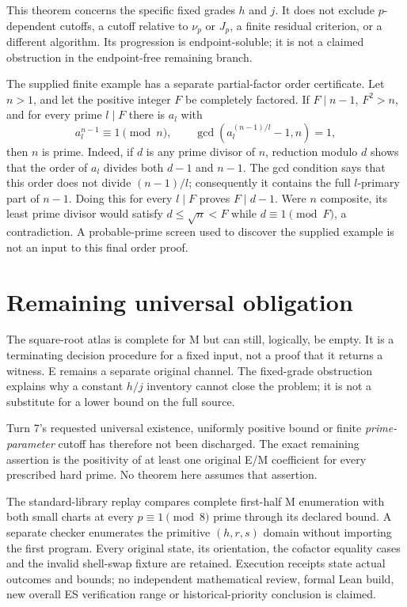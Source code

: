 This theorem concerns the specific fixed grades $h$ and $j$. It does not exclude
$p$-dependent cutoffs, a cutoff relative to $\nu_p$ or $J_p$, a finite residual
criterion, or a different algorithm. Its progression is endpoint-soluble; it is
not a claimed obstruction in the endpoint-free remaining branch.

The supplied finite example has a separate partial-factor order certificate.
Let $n>1$, and let the positive integer $F$ be completely factored. If
$F\mid n-1$, $F^2>n$, and for every prime
$l\mid F$ there is $a_l$ with
\[
 a_l^{n-1}\equiv1\pmod n,\qquad
 \gcd(a_l^{(n-1)/l}-1,n)=1,
\]
then $n$ is prime. Indeed, if $d$ is any prime divisor of $n$, reduction
modulo $d$ shows that the order of $a_l$ divides both $d-1$ and $n-1$.
The gcd condition says that this order does not divide $(n-1)/l$; consequently
it contains the full $l$-primary part of $n-1$. Doing this for every
$l\mid F$ proves $F\mid d-1$. Were $n$ composite, its least prime divisor
would satisfy $d\le\sqrt n<F$ while $d\equiv1\pmod F$, a contradiction.
A probable-prime screen used to discover the supplied example is not an input
to this final order proof.

\section{Remaining universal obligation}
The square-root atlas is complete for M but can still, logically, be empty.
It is a terminating decision procedure for a fixed input, not a proof that it
returns a witness. E remains a separate original channel. The fixed-grade
obstruction explains why a constant $h/j$ inventory cannot close the problem;
it is not a substitute for a lower bound on the full source.

Turn 7's requested universal existence, uniformly positive bound or finite
\emph{prime-parameter} cutoff has therefore not been discharged. The exact
remaining assertion is the positivity of at least one original E/M coefficient
for every prescribed hard prime. No theorem here assumes that assertion.

The standard-library replay compares complete first-half M enumeration with
both small charts at every $p\equiv1\pmod8$ prime through its declared bound.
A separate checker enumerates the primitive $(h,r,s)$ domain without importing
the first program. Every original state, its orientation, the cofactor equality
cases and the invalid shell-swap fixture are retained. Execution receipts state
actual outcomes and bounds; no independent mathematical review, formal Lean
build, new overall ES verification range or historical-priority conclusion is
claimed.
